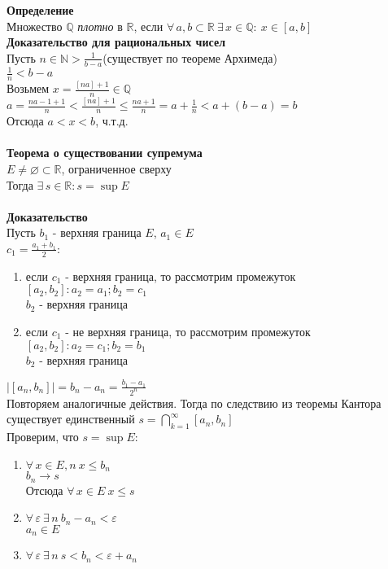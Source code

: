 \documentclass[12pt]{article}
\begin{document}
\textbf{Определение}\\
Множество $\mathbb{Q}$ \textit{плотно} в $\mathbb{R}$, если $\forall\,a,b \subset \mathbb{R}\ \exists\,x\in \mathbb{Q}:\ x\in[a,b]$\\
\textbf{Доказательство для рациональных чисел}\\
Пусть $n \in \mathbb{N} > \frac 1{b-a}$(существует по теореме Архимеда)\\
$\frac 1n < b-a$\\
Возьмем $x=\frac {[na]+1}n \in \mathbb{Q}$\\
$a=\frac{na-1+1}n < \frac{[na]+1}n \leq \frac{na+1}n = a+\frac 1n < a + (b-a) = b$\\
Отсюда $a<x< b$, ч.т.д.\\\\
\textbf{Теорема о существовании супремума}\\
$E\neq \varnothing \subset \mathbb{R}$, ограниченное сверху\\
Тогда $\exists\,s \in \mathbb{R}: s = \sup E$\\\\
\textbf{Доказательство}\\
Пусть $b_1$ - верхняя граница $E$, $a_1 \in E$\\
$c_1=\frac{a_1+b_1}2$:
\begin{enumerate}
    \item если $c_1$ - верхняя граница, то рассмотрим промежуток $[a_2, b_2]: a_2 = a_1; b_2 = c_1$\\
    $b_2$ - верхняя граница
    \item если $c_1$ - не верхняя граница, то рассмотрим промежуток $[a_2, b_2]: a_2 = c_1; b_2 = b_1$\\
    $b_2$ - верхняя граница
\end{enumerate}
$|[a_n,b_n]| = b_n-a_n=\frac{b_1-a_1}{2^n}$\\
Повторяем аналогичные действия. Тогда по следствию из теоремы Кантора существует единственный $s = \bigcap_{k=1}^{\infty} [a_n,b_n]$\\
Проверим, что $s = \sup E$:
\begin{enumerate}
    \item $\forall\,x\in E, n\ x\leq b_n$\\
    $b_n\rightarrow s$\\
    Отсюда $\forall\,x\in E\ x\leq s$
    \item $\forall\,\varepsilon\ \exists\,n\ b_n-a_n<\varepsilon$\\
    $a_n \in E$
    \item $\forall\,\varepsilon\ \exists\,n\ s < b_n<\varepsilon+a_n$
\end{enumerate}
\end{document}
